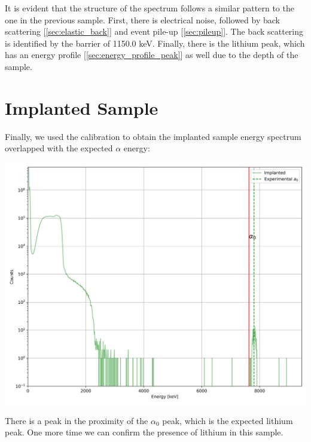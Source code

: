 \documentclass{article}
\begin{document}
\begin{multicols}{2}
It is evident that the structure of the spectrum follows a similar pattern to the one in the previous sample.
First, there is electrical noise, followed by back scattering [\ref{sec:elastic_back}] and event pile-up [\ref{sec:pileup}].
The back scattering is identified by the barrier of 1150.0 keV.
Finally, there is the lithium peak, which has an energy profile [\ref{sec:energy_profile_peak}] as well due to the depth of the sample.

\section{Implanted Sample}
    \label{sec:implanted}

Finally, we used the calibration to obtain the implanted sample energy spectrum overlapped with the expected $\alpha$ energy:

\begin{center}
    \label{TT_21}
    \centering
    \includegraphics[scale = 0.3]{../../images/OverlapImplanted.jpeg}
\end{center}

There is a peak in the proximity of the $\alpha_0$ peak, which is the expected lithium peak.
One more time we can confirm the presence of lithium in this sample.


\end{multicols}
\end{document}
